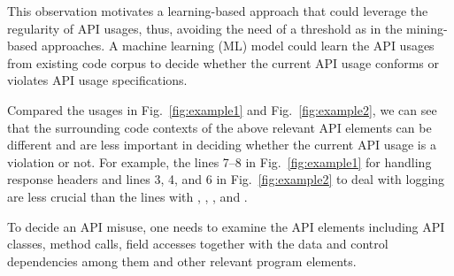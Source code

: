 This observation motivates a learning-based approach that could
leverage the regularity of API usages, thus, avoiding the need of
a threshold as in the mining-based approaches. A machine learning (ML)
model could learn the API usages from existing code corpus to decide
whether the current API usage conforms or violates API usage
specifications.

Compared the usages in Fig.~\ref{fig:example1} and
Fig.~\ref{fig:example2}, we can see that the surrounding code contexts
of the above relevant API elements can be different and are less
important in deciding whether the current API usage is a violation or
not. For example, the lines 7--8 in Fig.~\ref{fig:example1} for
handling response headers and lines 3, 4, and 6 in
Fig.~\ref{fig:example2} to deal with logging are less crucial than the
lines with , ,
, and .

\begin{Observation}
To decide an API misuse, one needs to examine the API elements
including API classes, method calls, field accesses together with the
data and control dependencies among them and other relevant program
elements.
\end{Observation}

%
